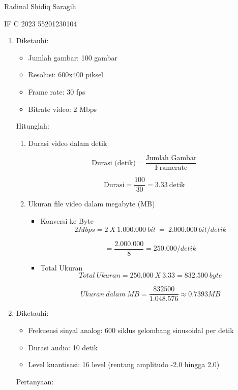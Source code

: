 \documentclass[12pt,a4paper]{article}
\date{}
\begin{document}
Radinal Shidiq Saragih

IF C 2023 55201230104

\begin{enumerate}

  \item Diketauhi:
    \begin{itemize}
      \item Jumlah gambar: 100 gambar
      \item Resolusi: 600x400 piksel
      \item Frame rate: 30 fps
      \item Bitrate video: 2 Mbps
    \end{itemize}

    Hitunglah:
    \begin{enumerate}
      \item Durasi video dalam detik

        \[
          \text{Durasi (detik)} = \frac{\text{Jumlah Gambar}}{\text{Framerate}}
        \]

        \[
          \text{Durasi} = \frac{100}{30} = 3.33 \ \text{detik}
        \]

      \item Ukuran file video dalam megabyte (MB)

        \begin{itemize}
          \item Konversi ke Byte
            \[
              2Mbps = 2\ X\ 1.000.000\ bit\ =\ 2.000.000\ bit/detik
            \]

            \[
              =\frac{2.000.000}{8} = 250.000/detik
            \]

          \item Total Ukuran
            \[
              Total\ Ukuran = 250.000\ X\ 3.33 = 832.500\ byte
            \]

            \[
              Ukuran\ dalam\ MB = \frac{832500}{1.048.576} \approx 0.7393 MB
            \]
        \end{itemize}

    \end{enumerate}

  \item Diketauhi:
    \begin{itemize}
      \item Frekuensi sinyal analog: 600 siklus gelombang sinusoidal per detik
      \item Durasi audio: 10 detik
      \item Level kuantisasi: 16 level (rentang amplitudo -2.0 hingga 2.0)
    \end{itemize}
    Pertanyaan:
    \begin{enumerate}


\end{enumerate}
\end{enumerate}
\end{document}
